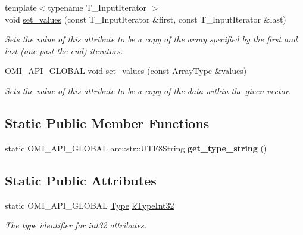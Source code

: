 \begin{DoxyCompactItemize}
{\footnotesize template$<$typename T\+\_\+\+Input\+Iterator $>$ }\\void \hyperlink{classomi_1_1_int32_attribute_ab6bc4bba2260a2952e4c3e4629bebcb2}{set\+\_\+values} (const T\+\_\+\+Input\+Iterator \&first, const T\+\_\+\+Input\+Iterator \&last)
\begin{DoxyCompactList}\small\item\em Sets the value of this attribute to be a copy of the array specified by the first and last (one past the end) iterators. \end{DoxyCompactList}\item 
O\+M\+I\+\_\+\+A\+P\+I\+\_\+\+G\+L\+O\+B\+AL void \hyperlink{classomi_1_1_int32_attribute_a1863bba4dc4d71a3d919d804c8e1a1de}{set\+\_\+values} (const \hyperlink{classomi_1_1_int32_attribute_a09ae7167f71512dc47ef34d96bf3baf5}{Array\+Type} \&values)
\begin{DoxyCompactList}\small\item\em Sets the value of this attribute to be a copy of the data within the given vector. \end{DoxyCompactList}\end{DoxyCompactItemize}
\subsection*{Static Public Member Functions}
\begin{DoxyCompactItemize}
\item 
static O\+M\+I\+\_\+\+A\+P\+I\+\_\+\+G\+L\+O\+B\+AL arc\+::str\+::\+U\+T\+F8\+String {\bfseries get\+\_\+type\+\_\+string} ()\hypertarget{classomi_1_1_int32_attribute_a7c4650bf0ff46163f7c85532bebc6fe3}{}\label{classomi_1_1_int32_attribute_a7c4650bf0ff46163f7c85532bebc6fe3}

\end{DoxyCompactItemize}
\subsection*{Static Public Attributes}
\begin{DoxyCompactItemize}
\item 
static O\+M\+I\+\_\+\+A\+P\+I\+\_\+\+G\+L\+O\+B\+AL \hyperlink{classomi_1_1_attribute_aae4992bc8d2b12679548909bc813eecf}{Type} \hyperlink{classomi_1_1_int32_attribute_aff60d30ef7b90e9bd02631f74d0f0d94}{k\+Type\+Int32}\hypertarget{classomi_1_1_int32_attribute_aff60d30ef7b90e9bd02631f74d0f0d94}{}\label{classomi_1_1_int32_attribute_aff60d30ef7b90e9bd02631f74d0f0d94}

\begin{DoxyCompactList}\small\item\em The type identifier for int32 attributes. \end{DoxyCompactList}\end{DoxyCompactItemize}
